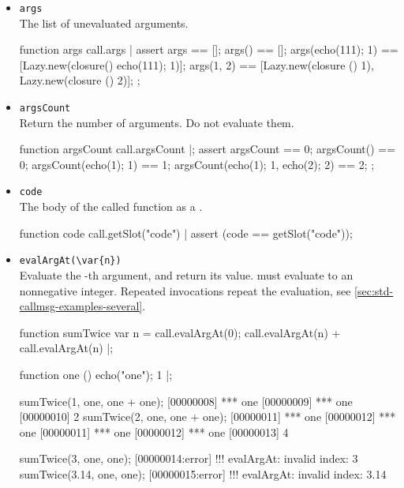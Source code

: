 \begin{itemize}
\item \lstinline|args|\\
  The list of unevaluated arguments.
\begin{urbiscript}[firstnumber=last]
function args { call.args }|
assert
{
  args == [];
  args() == [];
  args({echo(111); 1}) == [Lazy.new(closure() {echo(111); 1})];
  args(1, 2) == [Lazy.new(closure () {1}),
                 Lazy.new(closure () {2})];
};
\end{urbiscript}


\item \lstinline|argsCount|\\
  Return the number of arguments.  Do not evaluate them.
\begin{urbiscript}[firstnumber=last]
function argsCount { call.argsCount }|;
assert
{
  argsCount == 0;
  argsCount() == 0;
  argsCount({echo(1); 1}) == 1;
  argsCount({echo(1); 1}, {echo(2); 2}) == 2;
};
\end{urbiscript}

\item \lstinline|code|\\
  The body of the called function as a .
\begin{urbiscript}[firstnumber=last]
function code { call.getSlot("code") }|
assert (code == getSlot("code"));
\end{urbiscript}

\item \lstinline|evalArgAt(\var{n})|\\
  Evaluate the -th argument, and return its value.  
  must evaluate to an nonnegative integer.  Repeated invocations
  repeat the evaluation, see
  \autoref{sec:std-callmsg-examples-several}.
\begin{urbiscript}[firstnumber=last]
function sumTwice
{
  var n = call.evalArgAt(0);
  call.evalArgAt(n) + call.evalArgAt(n)
}|;

function one () { echo("one"); 1 }|;

sumTwice(1, one, one + one);
[00000008] *** one
[00000009] *** one
[00000010] 2
sumTwice(2, one, one + one);
[00000011] *** one
[00000012] *** one
[00000011] *** one
[00000012] *** one
[00000013] 4

sumTwice(3, one, one);
[00000014:error] !!! evalArgAt: invalid index: 3
sumTwice(3.14, one, one);
[00000015:error] !!! evalArgAt: invalid index: 3.14
\end{urbiscript}


\end{itemize}
